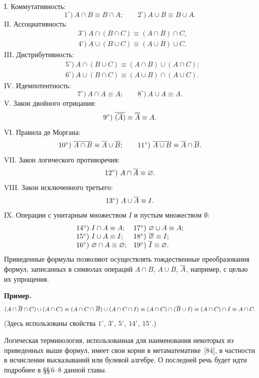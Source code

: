 I. Коммутативность:
\[
1^\circ)\ A\cap B\equiv B\cap A;\qquad 2^\circ)\ A\cup B\equiv B\cup A.
\]
II. Ассоциативность:
\[
\begin{aligned}
&3^\circ)\ A\cap(B\cap C)\equiv(A\cap B)\cap C,\\
&4^\circ)\ A\cup(B\cup C)\equiv(A\cup B)\cup C.
\end{aligned}
\]
%
III. Дистрибутивность:
\[
\begin{aligned}
&5^\circ)\ A\cap(B\cup C)\equiv(A\cap B)\cup(A\cap C);\\
&6^\circ)\ A\cup(B\cap C)\equiv(A\cup B)\cap(A\cup C).
\end{aligned}
\]
IV. Идемпотентность:
\[
7^\circ)\ A\cap A\equiv A;\qquad 8^\circ)\ A\cup A\equiv A.
\]
V. Закон двойного отрицания:
\[
9^\circ)\ \ov{(\ov A)}\equiv\ov{\ov A}\equiv A.
\]
VI. Правила де Моргана:
\[
10^\circ)\ \overline{A\cap B}\equiv\overline{A}\cup\overline{B};\qquad
11^\circ)\ \overline{A\cup B}\equiv\overline{A}\cap\overline{B}.
\]
VII. Закон логического противоречия:
\[
12^\circ)\ A\cap\ov A\equiv\emptyset.
\]
VIII. Закон исключенного третьего:
\[
13^\circ)\ A\cup\overline{A}\equiv I.
\]
IX. Операции с унитарным множеством $I$ и пустым множеством $\emptyset$:
\[
\begin{array}{ll}
14^\circ)\ I\cap A\equiv A; & 17^\circ)\ \varnothing\cup A\equiv A;\\
15^\circ)\ I\cup A\equiv I; & 18^\circ)\ \overline{\varnothing}\equiv I;\\
16^\circ)\ \varnothing\cap A\equiv\varnothing; & 19^\circ)\ \overline{I}\equiv\varnothing.
\end{array}
\]
Приведенные формулы позволяют осуществлять тождественные преобразования
формул, записанных в символах операций $A\cap B$, $A\cup B$, $\overline{A}$,
например, с целью их упрощения.

{\small\noindent\textbf{Пример.}
\[
(A\cap\overline{B}\cap C)\cup(A\cap C)\equiv(A\cap C\cap\overline{B})\cup(A\cap C\cap I)
\equiv(A\cap C)\cap(\overline{B}\cup I)\equiv(A\cap C)\cap I\equiv A\cap C.
\]
(Здесь использованы свойства $1^\circ$, $3^\circ$, $5^\circ$, $14^\circ$,
$15^\circ$.)\par}

Логическая терминология, использованная для наименования некоторых из
приведенных выше формул, имеет свои корни в метаматематике~[84],
в частности в исчислении высказываний или булевой алгебре. О последней
речь будет идти подробнее в \S\S\,6--8 данной главы.

